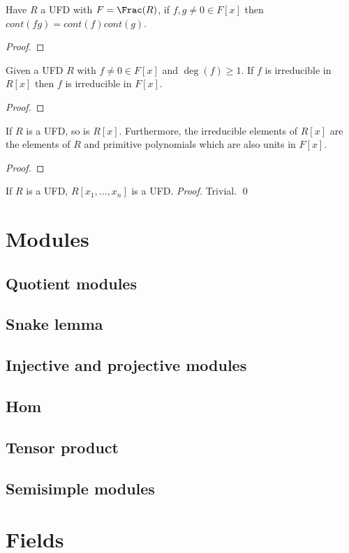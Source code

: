 \documentclass{report}
\begin{document}
\begin{lemma}
    Have $R$ a UFD with $F=\Frac(R)$, if $f,g\neq0\in F[x]$ then $cont(fg)=cont(f)cont(g)$.\begin{proof}
        
    \end{proof}
\end{lemma}

\begin{corollary}
    Given a UFD $R$ with $f\neq0\in F[x]$ and $\deg(f)\geq 1$. If $f$ is irreducible in $R[x]$ then $f$ is irreducible in $F[x]$.\begin{proof}
        
    \end{proof}
\end{corollary}

\begin{theorem}
    If $R$ is a UFD, so is $R[x]$. Furthermore, the irreducible elements of $R[x]$ are the elements of $R$ and primitive polynomials which are also units in $F[x]$. \begin{proof}
        
    \end{proof}
\end{theorem}

\begin{corollary}
    If $R$ is a UFD, $R[x_1,\ldots,x_n]$ is a UFD. \textit{Proof.} Trivial. \qed
\end{corollary}

\section{Modules}
\setcounter{subsection}{1}

\subsection{Quotient modules}

\subsection{Snake lemma}

\subsection{Injective and projective modules}

\subsection{Hom}

\subsection{Tensor product}

\subsection{Semisimple modules}

\section{Fields}
\end{document}
